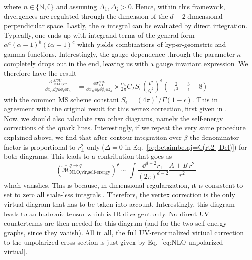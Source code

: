 where $n\in \{\mathbb{N},0\}$ and assuming $\Delta_1,\Delta_2>0$. Hence, within this framework, divergences are regulated through the dimension of the $d-2$ dimensional perpendicular space. Lastly, the $\alpha$ integral can be evaluated by direct integration. Typically, one ends up with integrand terms of the general form $\alpha^a (\alpha-1)^b (\zeta \alpha-1)^c$ which yields combinations of hyper-geometric and gamma functions. Interestingly, the gauge dependence through the parameter $\kappa$ completely drops out in the end, leaving us with a gauge invariant expression. We therefore have the result
\begin{equation}\label{eq:NLO unpolarized virtual}
\begin{aligned}
      \frac{\dd \sigma^{UUU}_{\text{NLO,vir}}}{\dd x_B \dd y \dd \phi_l \dd z_h}&= \frac{\dd \sigma^{UUU}_{\text{LO}}}{\dd x_B \dd y \dd \phi_l \dd z_h}\times\frac{\alpha_S}{2\pi}  C_F S_\epsilon \left(\frac{\mu^2}{Q^2}\right)^{\epsilon}\left(-\frac{2}{\epsilon^2}-\frac{3}{\epsilon}-8\right)
\end{aligned}
\end{equation}
with the common $\overline{\text{MS}}$ scheme constant $S_\epsilon=(4\pi)^\epsilon/\Gamma(1-\epsilon)$. This in agreement with the original result for this vertex correction, first given in \cite{altarelli_large_1979}. \\
Now, we should also calculate two other diagrams, namely the self-energy corrections of the quark lines. Interestingly, if we repeat the very same procedure explained above, we find that after contour integration over $\beta$ the denominator factor is proportional to $r_\perp^2$ only ($\Delta=0$ in Eq.~\ref{eq:betaimbetaj=C(rt2+Del)}) for both diagrams. This leads to a contribution that goes as
\begin{equation}
     (\hat{\mathcal{M}}^{q \to q}_{\text{NLO,vir,self-energy}})^\rho\sim\int\frac{\dd^{d-2} r_\perp}{(2\pi)^{d-2}}\frac{A+B\,r_\perp^2}{r_\perp^2}
\end{equation}
which vanishes. This is because, in dimensional regularization, it is consistent to set to zero all scale-less integrals \cite{Schwartz:2014sze}. Therefore, the vertex correction is the only virtual diagram that has to be taken into account. Interestingly, this diagram leads to an hadronic tensor which is IR divergent only. No direct UV counterterms are then needed for this diagram (and for the two self-energy graphs, since they vanish). All in all, the full UV-renormalized virtual correction to the unpolarized cross section is just given by Eq.~\ref{eq:NLO unpolarized virtual}.

